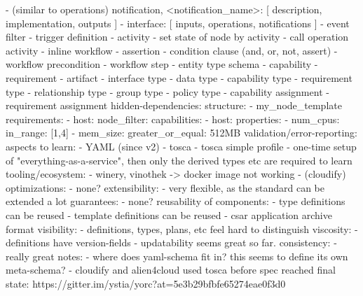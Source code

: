       - (similar to operations) notification, <notification_name>: [ description, implementation, outputs ]
      - interface: [ inputs, operations, notifications ]
      - event filter
      - trigger definition
      - activity
      - set state of node by activity
      - call operation activity
      - inline workflow
      - assertion
      - condition clause (and, or, not, assert)
      - workflow precondition
      - workflow step
      - entity type schema
      - capability
      - requirement
      - artifact
      - interface type
      - data type %
      - capability type
      - requirement type
      - relationship type
      - group type
      - policy type
      - capability assignment
      - requirement assignment
  hidden-dependencies:
  structure: %
    - my_node_template
        requirements:
        - host:
            node_filter:
              capabilities:
              - host:
                  properties:
                  - num_cpus: { in_range: [1,4] }
                  - mem_size: {greater_or_equal: 512MB }
  validation/error-reporting:
  aspects to learn:
    - YAML (since v2)
    - tosca %
    - tosca simple profile %
    - one-time setup of "everything-as-a-service", then only the derived types etc are required to learn
  tooling/ecosystem:
    - winery, vinothek -> docker image not working
    - (cloudify)
  optimizations:
    - none?
  extensibility:
    - very flexible, as the standard can be extended a lot
  guarantees:
    - none?
  reusability of components:
    - type definitions can be reused
    - template definitions can be reused
    - csar application archive format
  visibility:
    - definitions, types, plans, etc feel hard to distinguish
  viscosity:
    - definitions have version-fields
    - updatability seems great so far.
  consistency:
    - really great
  notes:
    - where does yaml-schema fit in? this seems to define its own meta-schema?
    - cloudify and alien4cloud used tosca before spec reached final state: https://gitter.im/ystia/yorc?at=5e3b29bfbfe65274eae0f3d0
